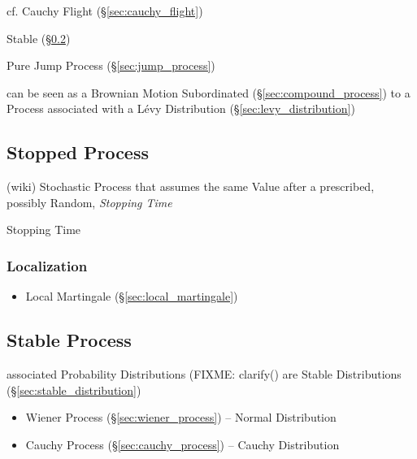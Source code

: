 \fist cf. Cauchy Flight (\S\ref{sec:cauchy_flight})

Stable (\S\ref{sec:stable_process})

Pure Jump Process (\S\ref{sec:jump_process})

can be seen as a Brownian Motion Subordinated (\S\ref{sec:compound_process}) to
a Process associated with a L\'evy Distribution (\S\ref{sec:levy_distribution})



\subsection{Stopped Process}\label{sec:stopped_process}

(wiki) Stochastic Process that assumes the same Value after a prescribed,
possibly Random, \emph{Stopping Time}

Stopping Time



\subsubsection{Localization}\label{sec:localization}

\begin{itemize}
  \item Local Martingale (\S\ref{sec:local_martingale})
\end{itemize}



\subsection{Stable Process}\label{sec:stable_process}

associated Probability Distributions (FIXME: clarify() are Stable Distributions
(\S\ref{sec:stable_distribution})

\begin{itemize}
  \item Wiener Process (\S\ref{sec:wiener_process}) -- Normal Distribution
  \item Cauchy Process (\S\ref{sec:cauchy_process}) -- Cauchy Distribution
\end{itemize}

